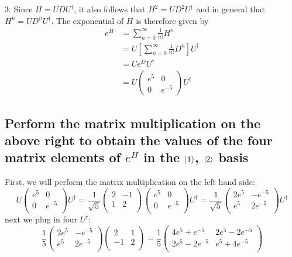 \documentclass{article}
\begin{document}
3. Since \( H = UDU^{\dagger} \), it also follows that \( H^2 = UD^2U^{\dagger} \) and in general that \( H^n = UD^nU^{\dagger} \). The exponential of \( H \) is therefore given by
\begin{align*}
e^H &= \sum_{n=0}^{\infty} \frac{1}{n!} H^n \\
&= U \left[ \sum_{n=0}^{\infty} \frac{1}{n!} D^n \right] U^{\dagger} \\
&= U e^D U^{\dagger} \\
&= U 
\begin{pmatrix}
e^5 & 0 \\
0 & e^{-5}
\end{pmatrix}
U^{\dagger}
\end{align*}
\subsection{Perform the matrix multiplication on the above right to obtain the values of the four matrix elements of \( e^H \) in the \( \ket{1} \), \( \ket{2} \) basis}

First, we will perform the matrix multiplication on the left hand side:
\begin{equation}
    U
    \begin{pmatrix}
        e^5 & 0 \\
        0 & e^{-5} \\
    \end{pmatrix}
    U^{\dagger}
=
    \frac{1}{\sqrt{5}}
    \begin{pmatrix}
        2 & -1 \\
        1 & 2 \\
    \end{pmatrix}
    \begin{pmatrix}
        e^5 & 0 \\
        0 & e^{-5} \\
    \end{pmatrix}
    U^{\dagger}
=
    \frac{1}{\sqrt{5}}
    \begin{pmatrix}
        2e^5 & -e^{-5} \\
        e^5 & 2e^{-5} \\
    \end{pmatrix}
    U^{\dagger}
\end{equation}
next we plug in four $U^{\dagger}$:
\begin{equation}
    \frac{1}{5}
    \begin{pmatrix}
        2e^5 & -e^{-5} \\
        e^5 & 2e^{-5} \\
    \end{pmatrix}
    \begin{pmatrix}
        2 & 1 \\
        -1 & 2 \\
    \end{pmatrix}
= \boxed{\frac{1}{5}
    \begin{pmatrix}
        4e^5 + e^{-5} & 2e^5 - 2e^{-5} \\
        2e^5 - 2e^{-5} & e^5 + 4e^{-5} \\
    \end{pmatrix}}
\end{equation}
\end{document}
